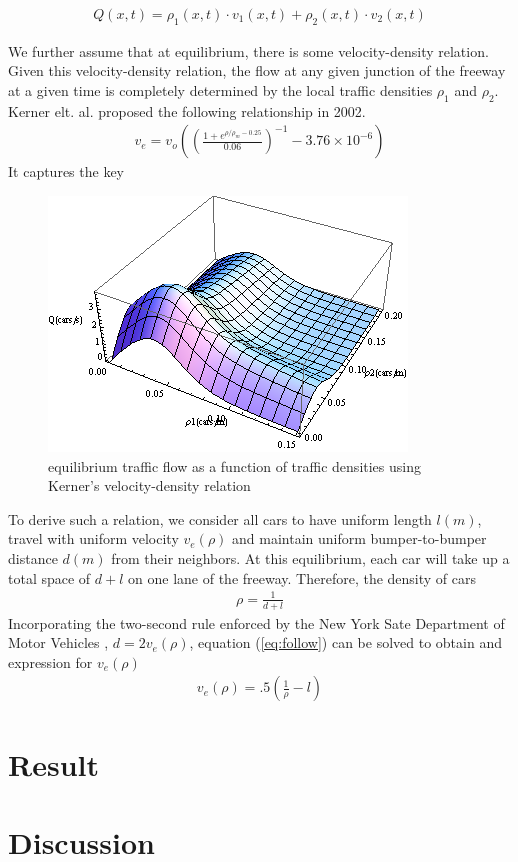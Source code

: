 \documentclass[aps,prl,superscriptaddress,12pt]{revtex4-1}
\begin{document}
	\begin{align}
	& Q(x,t) = \rho_1(x,t)\cdot v_1(x,t)+\rho_2(x,t)\cdot v_2(x,t) &
	\end{align}
	
	We further assume that at equilibrium, there is some velocity-density relation. Given this velocity-density relation, the flow at any given junction of the freeway at a given time is completely determined by the local traffic densities $\rho_1$ and $\rho_2$. 
Kerner elt. al. proposed the following relationship in 2002. 
	\begin{align}
	& v_e = v_o\left( (\frac{1+e^{\rho/\rho_m-0.25}}{0.06})^{-1} - 3.76\times10^{-6} \right) & \label{eq:Kerner}
	\end{align}
	It captures the key 
	\begin{figure}
	\includegraphics[scale=1]{plot/Q_p1_p2}
	\caption{equilibrium traffic flow as a function of traffic densities using Kerner's velocity-density relation\label{fig:Q_p1_p2}}
	\end{figure}
	
	
	To derive such a relation, we consider all cars to have uniform length $l(m)$, travel with uniform velocity $v_e(\rho)$ and maintain uniform bumper-to-bumper distance $d(m)$ from their neighbors. At this equilibrium, each car will take up a total space of $d+l$ on one lane of the freeway. Therefore, the density of cars
	\begin{align}
	& \rho = \frac{1}{d+l} & \label{eq:follow}
	\end{align}
	Incorporating the two-second rule enforced by the New York Sate Department of Motor Vehicles \cite{science_writing}, $d=2v_e(\rho)$, equation (\ref{eq:follow}) can be solved to obtain and expression for $v_e(\rho)$
	\begin{align}
	& v_e(\rho) =  .5(\frac{1}{\rho}-l)& 
	\end{align}
	
	\pagebreak

	\section{Result}

	\section{Discussion}
	


\end{document}
